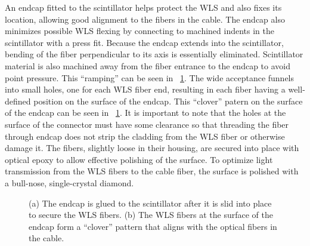 An endcap fitted to the scintillator helps protect the WLS and also fixes its location, allowing good alignment to the fibers in the cable.  The endcap also minimizes possible WLS flexing by connecting to machined indents in the scintillator with a press fit.  Because the endcap extends into the scintillator, bending of the fiber perpendicular to its axis is essentially eliminated.  Scintillator material is also machined away from the fiber entrance to the endcap to avoid point pressure.  This ``ramping'' can be seen in {\fig}~\ref{fig:paddleAssembly}.  The wide acceptance funnels into small holes, one for each WLS fiber end, resulting in each fiber having a well-defined position on the surface of the endcap.  This ``clover'' patern on the surface of the endcap can be seen in {\fig}~\ref{fig:paddleAssembly}.  It is important to note that the holes at the surface of the connector must have some clearance so that threading the fiber through endcap does not strip the cladding from the WLS fiber or otherwise damage it.  The fibers, slightly loose in their housing, are secured into place with optical epoxy to allow effective polishing of the surface.  To optimize light transmission from the WLS fibers to the cable fiber, the surface is polished with a bull-nose, single-crystal diamond.  
\begin{figure}[!htbp]
\centering
{}
\caption{(a) The endcap is glued to the scintillator after it is slid into place to secure the WLS fibers.  (b) The WLS fibers at the surface of the endcap form a ``clover'' pattern that aligns with the optical fibers in the cable.}
\label{fig:paddleAssembly}
\end{figure}

